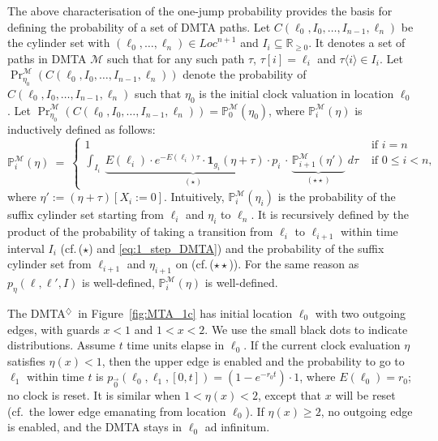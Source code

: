 \documentclass{LMCS}
\newcommand{\mc}[1]{\mathcal{#1}}
\newcommand{\<}{\langle}
\renewcommand{\>}{\rangle}
\newcommand{\les}{\leqslant}
\newcommand{\ges}{\geqslant}
\newcommand{\DMTAr}{\DMTA$^{\!\Ever}$}
\newcommand{\DMTA}{\textsc{DMTA}}
\newcommand{\Pro}{{\mathbb{P}}}
\newcommand{\F}{\mathop{\diamondsuit}}
\newcommand{\Reals}{\mathbb{R}}
\newcommand{\Ever}{\F}
\begin{document}
The above characterisation of the one-jump probability provides the basis for
defining the probability of a set of DMTA paths.
Let $C(\ell_0,I_0,\ldots\!,I_{n-1},\ell_n)$ be the cylinder set with $(\ell_0, \ldots\!, \ell_n)
\in {Loc}^{n+1}$ and $I_i \subseteq \Reals_{\ges 0}$.
It denotes a set of paths in DMTA $\mc{M}$ such that for any such path $\tau$, $\tau[i]
= \ell_i$ and $\tau\<i\> \in I_i$.
Let ${\Pr}^\mc{M}_{\eta_0}\left( C(\ell_{0},I_{0},\ldots\!,I_{n-1},\ell_n)\right)$ denote the
probability of $C(\ell_0,I_0,\ldots\!,I_{n-1},\ell_n)$ such that $\eta_0$ is the initial clock
valuation in location $\ell_0$.
Let ${\Pr}^\mc{M}_{\eta_0}\left( C(\ell_{0},I_{0},\ldots\!,I_{n-1},\ell_n)\right) =
\Pro^\mc{M}_0(\eta_0)$, where $\Pro^{\mc{M}}_{i}(\eta)$ is inductively defined as follows:
\begin{equation}\label{eq:semantics}
\Pro^{\mc{M}}_{i}(\eta) \ = \ \left\{
  \begin{array}{ll}
   1 & \mbox{ if } i = n \\[1ex]
   \displaystyle \int_{I_{i}}\
\underbrace{E(\ell_i){\cdot}e^{-E(\ell_{i})\tau} \cdot \mathbf{1}_{g_i}
(\eta+\tau) \cdot p_i}_{(\star)}\,\cdot\,\underbrace{\Pro^{\mc{M}}_{i+1}(\eta')}_{(\star\star)}\
d\tau & \mbox{ if } 0 \les i < n,
  \end{array} \right.
\end{equation}
where $\eta':=(\eta+\tau)[X_{i}:=0]$. Intuitively,
$\Pro^{\mc{M}}_i(\eta_i)$ is the probability of the suffix
cylinder set starting from $\ell_i$ and $\eta_i$ to $\ell_n$. It
is recursively defined by the product of the probability of
taking a transition from $\ell_i$ to $\ell_{i+1}$ within time interval
$I_i$ (cf.\,($\star$) and \eqref{eq:1_step_DMTA}) and the
probability of the suffix cylinder set from $\ell_{i+1}$ and
$\eta_{i+1}$ on (cf.\,($\star\star$)). For the same reason as
$p_{\eta}(\ell,\ell',I)$ is well-defined, $\Pro^{\mc{M}}_i(\eta)$ is well-defined.

\begin{exa}
The \DMTAr\ in Figure~\ref{fig:MTA_1c} has initial location $\ell_0$
with two outgoing edges, with guards $x<1$ and $1 < x < 2$.
We use the small black dots to indicate distributions.
Assume $t$ time units elapse in $\ell_0$.
If the current clock evaluation $\eta$ satisfies $\eta(x) < 1$, then the
upper edge is enabled and the probability to go to $\ell_1$ within time
$t$ is $p_{\vec{0}}(\ell_0,\ell_1,[0,t]) = (1-e^{-r_0t}){\cdot}1$, where
$E(\ell_0) = r_0$; no clock is reset.
It is similar when $1<\eta(x)<2$, except that $x$ will be reset (cf.\ the
lower edge emanating from location $\ell_0$).
If $\eta(x) \ges 2$, no outgoing edge is enabled, and the DMTA stays
in $\ell_0$ ad infinitum.
\end{exa}
\end{document}
